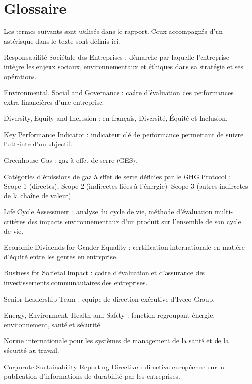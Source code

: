\section*{Glossaire}

Les termes suivants sont utilisés dans le rapport. Ceux accompagnés d'un astérisque dans le texte sont définis ici.

\begin{description}[style=nextline]
    \item[RSE] Responsabilité Sociétale des Entreprises : démarche par laquelle l'entreprise intègre les enjeux sociaux, environnementaux et éthiques dans sa stratégie et ses opérations.
    \item[ESG] Environmental, Social and Governance : cadre d'évaluation des performances extra-financières d'une entreprise.
    \item[DEI] Diversity, Equity and Inclusion : en français, Diversité, Équité et Inclusion.
    \item[KPI] Key Performance Indicator : indicateur clé de performance permettant de suivre l'atteinte d'un objectif.
    \item[GHG] Greenhouse Gas : gaz à effet de serre (GES).
    \item[Scope 1, 2, 3] Catégories d'émissions de gaz à effet de serre définies par le GHG Protocol : Scope 1 (directes), Scope 2 (indirectes liées à l'énergie), Scope 3 (autres indirectes de la chaîne de valeur).
    \item[LCA] Life Cycle Assessment : analyse du cycle de vie, méthode d'évaluation multi-critères des impacts environnementaux d'un produit sur l'ensemble de son cycle de vie.
    \item[EDGE] Economic Dividends for Gender Equality : certification internationale en matière d'équité entre les genres en entreprise.
    \item[B4SI] Business for Societal Impact : cadre d'évaluation et d'assurance des investissements communautaires des entreprises.
    \item[SLT] Senior Leadership Team : équipe de direction exécutive d'Iveco Group.
    \item[EEHS] Energy, Environment, Health and Safety : fonction regroupant énergie, environnement, santé et sécurité.
    \item[ISO 45001] Norme internationale pour les systèmes de management de la santé et de la sécurité au travail.
    \item[CSRD] Corporate Sustainability Reporting Directive : directive européenne sur la publication d'informations de durabilité par les entreprises.

\end{description}

